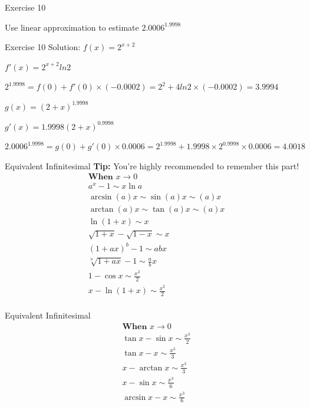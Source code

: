 \begin{frame}{Exercise 10}
    \begin{block}{}
        Use linear approximation to estimate $2.0006^{1.9998}$
    \end{block}
\end{frame}



\begin{frame}{Exercise 10}
    Solution:
    $f(x) = 2^{x+2}$

    $f'(x) = 2^{x+2}ln2$

    $2^{1.9998} = f(0) + f'(0) \times (-0.0002) =  2^2 + 4ln2 \times (-0.0002) = 3.9994$

    $g(x) = (2+x)^{1.9998}$

    $g'(x) = 1.9998(2+x)^{0.9998}$

    $2.0006^{1.9998} = g(0) + g'(0)\times 0.0006 = 2^{1.9998} + 1.9998\times 2^{0.9998}\times 0.0006 = 4.0018$

\end{frame}


\begin{frame}{Equivalent Infinitesimal}
    \textbf{Tip:} You're highly recommended to remember this part!
    $$
        \begin{aligned}
             & \textbf{When } x \rightarrow 0          \\
             & a^{x}-1 \sim x \ln a                    \\
             & \arcsin (a) x \sim \sin (a) x \sim(a) x \\
             & \arctan (a) x \sim \tan (a) x \sim(a) x \\
             & \ln (1+x) \sim x                        \\
             & \sqrt{1+x}-\sqrt{1-x} \sim x            \\
             & (1+a x)^{b}-1 \sim a b x                \\
             & \sqrt[b]{1+a x}-1 \sim \frac{a}{b} x    \\
             & 1-\cos x \sim \frac{x^{2}}{2}           \\
             & x-\ln (1+x) \sim \frac{x^{2}}{2}        \\
        \end{aligned}
    $$
\end{frame}




\begin{frame}{Equivalent Infinitesimal}
    $$
        \begin{aligned}
             & \textbf{When } x \rightarrow 0     \\
             & \tan x-\sin x \sim \frac{x^{3}}{2} \\
             & \tan x-x \sim \frac{x^{3}}{3}      \\
             & x-\arctan x \sim \frac{x^{3}}{3}   \\
             & x-\sin x \sim \frac{x^{3}}{6}      \\
             & \arcsin x-x \sim \frac{x^{3}}{6}   \\
        \end{aligned}
    $$
\end{frame}


